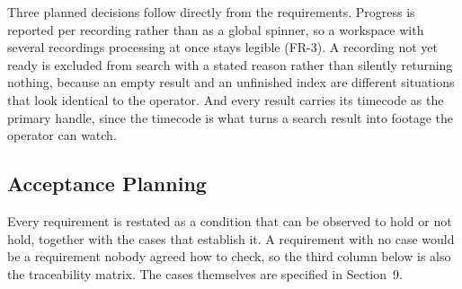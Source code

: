 \documentclass[11pt,a4paper]{article}
\begin{document}
Three planned decisions follow directly from the requirements. Progress is
reported per recording rather than as a global spinner, so a workspace with
several recordings processing at once stays legible (FR-3). A recording not yet
ready is excluded from search with a stated reason rather than silently
returning nothing, because an empty result and an unfinished index are different
situations that look identical to the operator. And every result carries its
timecode as the primary handle, since the timecode is what turns a search result
into footage the operator can watch.

\subsection{Acceptance Planning}

Every requirement is restated as a condition that can be observed to hold or not
hold, together with the cases that establish it. A requirement with no case
would be a requirement nobody agreed how to check, so the third column below is
also the traceability matrix. The cases themselves are specified in Section~9.
\end{document}
